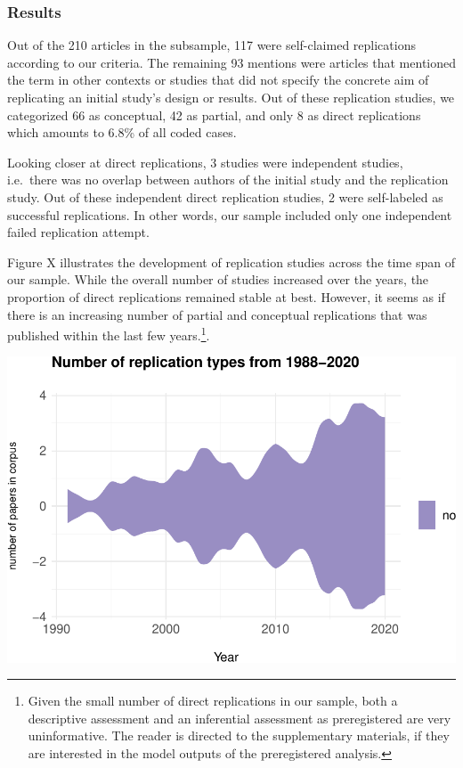 \documentclass[]{elsarticle} %
\begin{document}
\hypertarget{results-1}{%
\subsubsection{Results}\label{results-1}}

Out of the 210 articles in the subsample, 117 were self-claimed
replications according to our criteria. The remaining 93 mentions were
articles that mentioned the term in other contexts or studies that did
not specify the concrete aim of replicating an initial study's design or
results. Out of these replication studies, we categorized 66 as
conceptual, 42 as partial, and only 8 as direct replications which
amounts to 6.8\% of all coded cases.

Looking closer at direct replications, 3 studies were independent
studies, i.e.~there was no overlap between authors of the initial study
and the replication study. Out of these independent direct replication
studies, 2 were self-labeled as successful replications. In other words,
our sample included only one independent failed replication attempt.

Figure X illustrates the development of replication studies across the
time span of our sample. While the overall number of studies increased
over the years, the proportion of direct replications remained stable at
best. However, it seems as if there is an increasing number of partial
and conceptual replications that was published within the last few
years.\footnote{Given the small number of direct replications in our
  sample, both a descriptive assessment and an inferential assessment as
  preregistered are very uninformative. The reader is directed to the
  supplementary materials, if they are interested in the model outputs
  of the preregistered analysis.}.

\begin{center}\includegraphics[width=1\linewidth]{ReplicationLing_files/figure-latex/steam_plot-1} \end{center}
\end{document}
